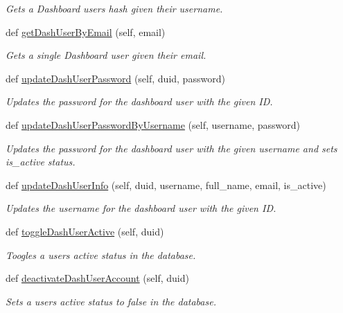 \begin{DoxyCompactItemize}
\begin{DoxyCompactList}\small\item\em Gets a Dashboard user\textquotesingle{}s hash given their username. \end{DoxyCompactList}\item 
def \hyperlink{classuser__dao_1_1_user_d_a_o_a0ba6ba2b47d276250b1fbe7c8879b31b}{get\+Dash\+User\+By\+Email} (self, email)
\begin{DoxyCompactList}\small\item\em Gets a single Dashboard user given their email. \end{DoxyCompactList}\item 
def \hyperlink{classuser__dao_1_1_user_d_a_o_af1450b38cd22cd9511c45784ba910ae9}{update\+Dash\+User\+Password} (self, duid, password)
\begin{DoxyCompactList}\small\item\em Updates the password for the dashboard user with the given ID. \end{DoxyCompactList}\item 
def \hyperlink{classuser__dao_1_1_user_d_a_o_abd510210bf36871b3c58291ff7726205}{update\+Dash\+User\+Password\+By\+Username} (self, username, password)
\begin{DoxyCompactList}\small\item\em Updates the password for the dashboard user with the given username and sets is\+\_\+active status. \end{DoxyCompactList}\item 
def \hyperlink{classuser__dao_1_1_user_d_a_o_a38e0a49d3aa13111b1d54a6c9aaa0286}{update\+Dash\+User\+Info} (self, duid, username, full\+\_\+name, email, is\+\_\+active)
\begin{DoxyCompactList}\small\item\em Updates the username for the dashboard user with the given ID. \end{DoxyCompactList}\item 
def \hyperlink{classuser__dao_1_1_user_d_a_o_a7a046b936497fa50d228a04c2cb0e5d6}{toggle\+Dash\+User\+Active} (self, duid)
\begin{DoxyCompactList}\small\item\em Toogles a user\textquotesingle{}s active status in the database. \end{DoxyCompactList}\item 
def \hyperlink{classuser__dao_1_1_user_d_a_o_a55c3e96853d2538ff2608caab27c83f9}{deactivate\+Dash\+User\+Account} (self, duid)
\begin{DoxyCompactList}\small\item\em Sets a user\textquotesingle{}s active status to false in the database. \end{DoxyCompactList}\item 

\end{DoxyCompactItemize}
